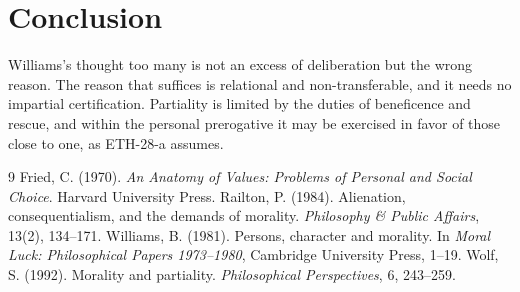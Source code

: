 \documentclass{situationist-preprint}
\begin{document}
\section{Conclusion}

Williams's thought too many is not an excess of deliberation but the wrong reason. The reason that suffices is relational and non-transferable, and it needs no impartial certification. Partiality is limited by the duties of beneficence and rescue, and within the personal prerogative it may be exercised in favor of those close to one, as ETH-28-a assumes.

\begin{thebibliography}{9}\small
{} Fried, C. (1970). \emph{An Anatomy of Values: Problems of Personal and Social Choice}. Harvard University Press.
 Railton, P. (1984). Alienation, consequentialism, and the demands of morality. \emph{Philosophy \& Public Affairs}, 13(2), 134--171.
 Williams, B. (1981). Persons, character and morality. In \emph{Moral Luck: Philosophical Papers 1973--1980}, Cambridge University Press, 1--19.
 Wolf, S. (1992). Morality and partiality. \emph{Philosophical Perspectives}, 6, 243--259.
\end{thebibliography}
\end{document}
